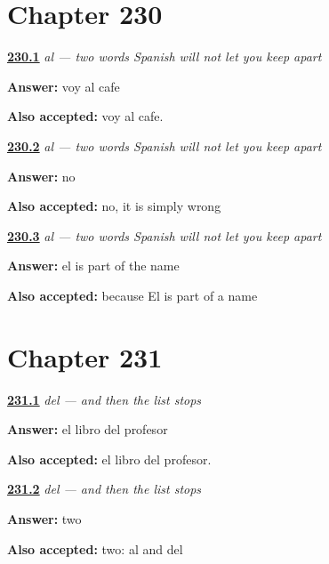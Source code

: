 \section*{Chapter 230}

\noindent\begin{minipage}[t]{\linewidth}
\raggedright
\hyperlink{review-ES-C61-al-say}{\textbf{230.1}} \emph{al — two words Spanish will not let you keep apart}\par
\small \textbf{Answer:} voy al cafe\par
\footnotesize \textbf{Also accepted:} voy al cafe.
\end{minipage}\par\medskip

\noindent\begin{minipage}[t]{\linewidth}
\raggedright
\hyperlink{review-ES-C61-al-must}{\textbf{230.2}} \emph{al — two words Spanish will not let you keep apart}\par
\small \textbf{Answer:} no\par
\footnotesize \textbf{Also accepted:} no, it is simply wrong
\end{minipage}\par\medskip

\noindent\begin{minipage}[t]{\linewidth}
\raggedright
\hyperlink{review-ES-C61-al-name}{\textbf{230.3}} \emph{al — two words Spanish will not let you keep apart}\par
\small \textbf{Answer:} el is part of the name\par
\footnotesize \textbf{Also accepted:} because El is part of a name
\end{minipage}\par\medskip

\section*{Chapter 231}

\noindent\begin{minipage}[t]{\linewidth}
\raggedright
\hyperlink{review-ES-C61-del-say}{\textbf{231.1}} \emph{del — and then the list stops}\par
\small \textbf{Answer:} el libro del profesor\par
\footnotesize \textbf{Also accepted:} el libro del profesor.
\end{minipage}\par\medskip

\noindent\begin{minipage}[t]{\linewidth}
\raggedright
\hyperlink{review-ES-C61-del-count}{\textbf{231.2}} \emph{del — and then the list stops}\par
\small \textbf{Answer:} two\par
\footnotesize \textbf{Also accepted:} two: al and del
\end{minipage}\par\medskip

